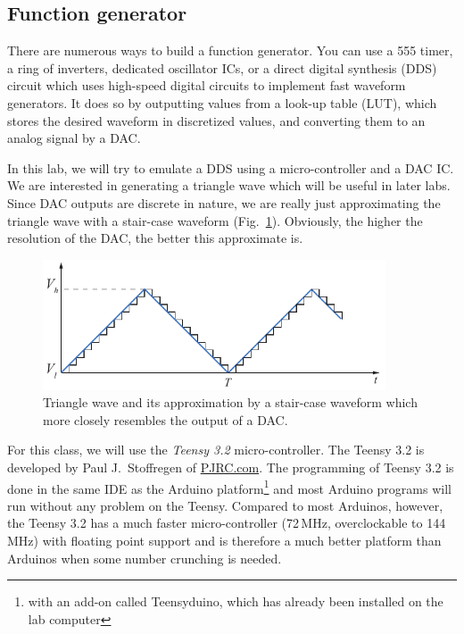 \documentclass[letterpaper, 11pt]{article}
\begin{document}
\subsection{Function generator}
\label{sec:func-generator}

There are numerous ways to build a function generator. You can use a 555 timer, a ring of inverters, dedicated oscillator ICs, or a direct digital synthesis (DDS) circuit which uses high-speed digital circuits to implement fast waveform generators. It does so by outputting values from a look-up table (LUT), which stores the desired waveform in discretized values, and converting them to an analog signal by a DAC. 

In this lab, we will try to emulate a DDS using a micro-controller and a DAC IC. We are interested in generating a triangle wave which will be useful in later labs. Since DAC outputs are discrete in nature, we are really just approximating the triangle wave with a stair-case waveform (Fig.~\ref{fig:triangle-wave}). Obviously, the higher the resolution of the DAC, the better this approximate is. 

	\begin{figure}[h]
		\centering
		\includegraphics[width=4in]{triangle-wave}
		\caption{Triangle wave and its approximation by a stair-case waveform which more closely resembles the output of a DAC.}
		\label{fig:triangle-wave}
	\end{figure}

For this class, we will use the \textit{Teensy 3.2} micro-controller. The Teensy 3.2 is developed by Paul J.~Stoffregen of \href{https://www.pjrc.com}{PJRC.com}. The programming of Teensy 3.2 is done in the same IDE as the Arduino platform\footnote{with an add-on called Teensyduino, which has already been installed on the lab computer} and most Arduino programs will run without any problem on the Teensy. Compared to most Arduinos, however, the Teensy 3.2 has a much faster micro-controller (72\,MHz, overclockable to 144\,MHz) with floating point support and is therefore a much better platform than Arduinos when some number crunching is needed. 
\end{document}
